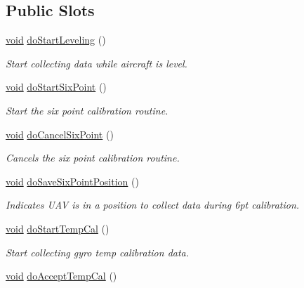 \subsection*{Public Slots}
\begin{DoxyCompactItemize}
\item 
\hyperlink{group___u_a_v_objects_plugin_ga444cf2ff3f0ecbe028adce838d373f5c}{void} \hyperlink{class_calibration_a74c9adf432cfde3c607dc3459c9ff5b1}{do\-Start\-Leveling} ()
\begin{DoxyCompactList}\small\item\em Start collecting data while aircraft is level. \end{DoxyCompactList}\item 
\hyperlink{group___u_a_v_objects_plugin_ga444cf2ff3f0ecbe028adce838d373f5c}{void} \hyperlink{class_calibration_a5bea779241f9d9bb50e2c670ea588a43}{do\-Start\-Six\-Point} ()
\begin{DoxyCompactList}\small\item\em Start the six point calibration routine. \end{DoxyCompactList}\item 
\hyperlink{group___u_a_v_objects_plugin_ga444cf2ff3f0ecbe028adce838d373f5c}{void} \hyperlink{class_calibration_a5a9bae0780189e6dfd1aadaa825232e0}{do\-Cancel\-Six\-Point} ()
\begin{DoxyCompactList}\small\item\em Cancels the six point calibration routine. \end{DoxyCompactList}\item 
\hyperlink{group___u_a_v_objects_plugin_ga444cf2ff3f0ecbe028adce838d373f5c}{void} \hyperlink{class_calibration_a0d28935bfd66742e8551ddbdd98ce941}{do\-Save\-Six\-Point\-Position} ()
\begin{DoxyCompactList}\small\item\em Indicates U\-A\-V is in a position to collect data during 6pt calibration. \end{DoxyCompactList}\item 
\hyperlink{group___u_a_v_objects_plugin_ga444cf2ff3f0ecbe028adce838d373f5c}{void} \hyperlink{class_calibration_ad79bd9545005476bb15c478607e55a36}{do\-Start\-Temp\-Cal} ()
\begin{DoxyCompactList}\small\item\em Start collecting gyro temp calibration data. \end{DoxyCompactList}\item 
\hyperlink{group___u_a_v_objects_plugin_ga444cf2ff3f0ecbe028adce838d373f5c}{void} \hyperlink{class_calibration_a410796ba6e560144c62ec42a8b7bc9b9}{do\-Accept\-Temp\-Cal} ()

\end{DoxyCompactItemize}
